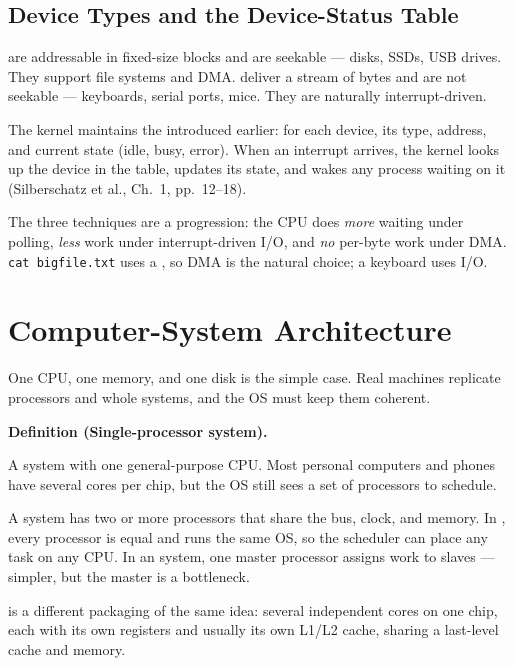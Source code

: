 \documentclass[11pt]{article}
\newenvironment{definitionbox}[1]{%
  \par\noindent\textbf{Definition (#1).}\ \itshape
}{\par\vspace{0.3em}}
\begin{document}
\subsection{Device Types and the Device-Status Table}

 are addressable in fixed-size blocks and are seekable --- disks, SSDs, USB drives. They support file systems and DMA.  deliver a stream of bytes and are not seekable --- keyboards, serial ports, mice. They are naturally interrupt-driven.

The kernel maintains the  introduced earlier: for each device, its type, address, and current state (idle, busy, error). When an interrupt arrives, the kernel looks up the device in the table, updates its state, and wakes any process waiting on it (Silberschatz et al., Ch.~1, pp.~12--18).

The three techniques are a progression: the CPU does \emph{more} waiting under polling, \emph{less} work under interrupt-driven I/O, and \emph{no} per-byte work under DMA. \texttt{cat bigfile.txt} uses a , so DMA is the natural choice; a keyboard uses  I/O.

\section{Computer-System Architecture}
\label{sec:architecture}

One CPU, one memory, and one disk is the simple case. Real machines replicate processors and whole systems, and the OS must keep them coherent.

\begin{definitionbox}{Single-processor system}
A system with one general-purpose CPU. Most personal computers and phones have several cores per chip, but the OS still sees a set of processors to schedule.
\end{definitionbox}

A  system has two or more processors that share the bus, clock, and memory. In , every processor is equal and runs the same OS, so the scheduler can place any task on any CPU. In an  system, one master processor assigns work to slaves --- simpler, but the master is a bottleneck.

 is a different packaging of the same idea: several independent cores on one chip, each with its own registers and usually its own L1/L2 cache, sharing a last-level cache and memory.
\end{document}
